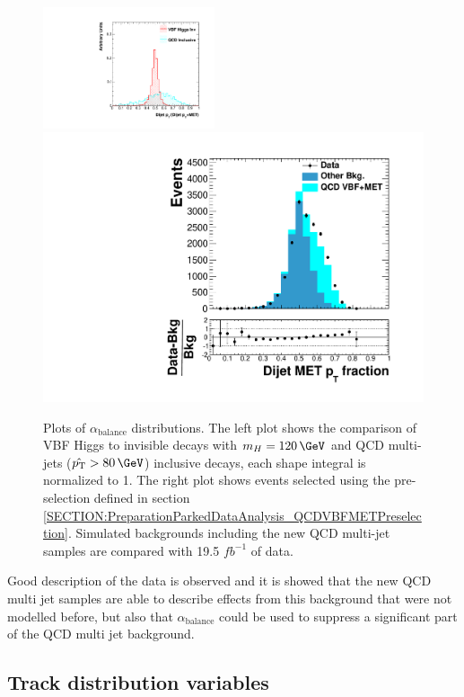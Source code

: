 \begin{figure}[!htb]
\centering
\includegraphics[width=0.45\textwidth]{Chapter06/TopologicalVariables/Images/JetPair_dijetOverMetPt.pdf} 
\includegraphics[width=0.45\linewidth]{Chapter06/QCD_VBFMET_Samples/PreSelection/Images//DEta3p6_MetSig3p0_MinDPhiJetsMet1p5/dijetmet_ptfraction.pdf}
\caption{Plots of $\alpha_{\text{balance}}$ distributions. The left plot shows the comparison of \gls{VBF} Higgs to invisible decays with $m_H=120\,\GeV$ and \gls{QCD} multi-jets ($\hat{\pt}>80\,\GeV$) inclusive decays, each shape integral is normalized to 1. The right plot shows events selected using the pre-selection defined in section \ref{SECTION:PreparationParkedDataAnalysis_QCDVBFMETPreselection}. Simulated backgrounds including the new \gls{QCD} multi-jet samples are compared with 19.5 $fb^{-1}$ of data.}
\label{FIGURE:PreparationParkedDataAnalysis_DijetMETSystemVars_2}
\end{figure}

Good description of the data is observed and it is showed that the new \gls{QCD} multi jet samples are able to describe effects from this background that were not modelled before, but also that $\alpha_{\text{balance}}$ could be used to suppress a significant part of the \gls{QCD} multi jet background.

\subsection{Track distribution variables}
\label{SECTION:PreparationParkedDataAnalysis_TrackDistributionVariables}

